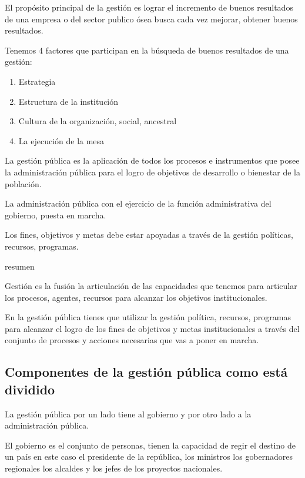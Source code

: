 \documentclass[
  jou,
  floatsintext,
  longtable,
  a4paper,
  nolmodern,
  notxfonts,
  notimes,
  12pt,
  colorlinks=true,linkcolor=blue,citecolor=blue,urlcolor=blue]{apa7}
\providecommand{\tightlist}{%
  \setlength{\itemsep}{0pt}\setlength{\parskip}{0pt}}
\begin{document}
El propósito principal de la gestión es lograr el incremento de buenos
resultados de una empresa o del sector publico ósea busca cada vez
mejorar, obtener buenos resultados.

Tenemos 4 factores que participan en la búsqueda de buenos resultados de
una gestión:

\begin{enumerate}
\def\labelenumi{\arabic{enumi}.}
\tightlist
\item
  Estrategia
\item
  Estructura de la institución
\item
  Cultura de la organización, social, ancestral
\item
  La ejecución de la mesa
\end{enumerate}

La gestión pública es la aplicación de todos los procesos e instrumentos
que posee la administración pública para el logro de objetivos de
desarrollo o bienestar de la población.

La administración pública con el ejercicio de la función administrativa
del gobierno, puesta en marcha.

Los fines, objetivos y metas debe estar apoyadas a través de la gestión
políticas, recursos, programas.

resumen

Gestión es la fusión la articulación de las capacidades que tenemos para
articular los procesos, agentes, recursos para alcanzar los objetivos
institucionales.

En la gestión pública tienes que utilizar la gestión política, recursos,
programas para alcanzar el logro de los fines de objetivos y metas
institucionales a través del conjunto de procesos y acciones necesarias
que vas a poner en marcha.

\subsection{Componentes de la gestión pública como está
dividido}\label{componentes-de-la-gestiuxf3n-puxfablica-como-estuxe1-dividido}

La gestión pública por un lado tiene al gobierno y por otro lado a la
administración pública.

El gobierno es el conjunto de personas, tienen la capacidad de regir el
destino de un país en este caso el presidente de la república, los
ministros los gobernadores regionales los alcaldes y los jefes de los
proyectos nacionales.
\end{document}
